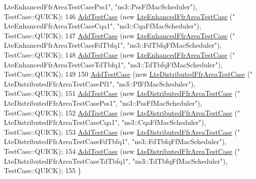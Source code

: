 \begin{DoxyCode}
{      LteEnhancedFfrAreaTestCasePss1"}, \textcolor{stringliteral}{"ns3::PssFfMacScheduler"}), TestCase::QUICK);
146   \hyperlink{classns3_1_1TestCase_a3718088e3eefd5d6454569d2e0ddd835}{AddTestCase} (\textcolor{keyword}{new} \hyperlink{classLteEnhancedFfrAreaTestCase}{LteEnhancedFfrAreaTestCase} (\textcolor{stringliteral}{"
      LteEnhancedFfrAreaTestCaseCqa1"}, \textcolor{stringliteral}{"ns3::CqaFfMacScheduler"}), TestCase::QUICK);
147   \hyperlink{classns3_1_1TestCase_a3718088e3eefd5d6454569d2e0ddd835}{AddTestCase} (\textcolor{keyword}{new} \hyperlink{classLteEnhancedFfrAreaTestCase}{LteEnhancedFfrAreaTestCase} (\textcolor{stringliteral}{"
      LteEnhancedFfrAreaTestCaseFdTbfq1"}, \textcolor{stringliteral}{"ns3::FdTbfqFfMacScheduler"}), TestCase::QUICK);
148   \hyperlink{classns3_1_1TestCase_a3718088e3eefd5d6454569d2e0ddd835}{AddTestCase} (\textcolor{keyword}{new} \hyperlink{classLteEnhancedFfrAreaTestCase}{LteEnhancedFfrAreaTestCase} (\textcolor{stringliteral}{"
      LteEnhancedFfrAreaTestCaseTdTbfq1"}, \textcolor{stringliteral}{"ns3::TdTbfqFfMacScheduler"}), TestCase::QUICK);
149 
150   \hyperlink{classns3_1_1TestCase_a3718088e3eefd5d6454569d2e0ddd835}{AddTestCase} (\textcolor{keyword}{new} \hyperlink{classLteDistributedFfrAreaTestCase}{LteDistributedFfrAreaTestCase} (\textcolor{stringliteral}{"
      LteDistributedFfrAreaTestCasePf1"}, \textcolor{stringliteral}{"ns3::PfFfMacScheduler"}), TestCase::QUICK);
151   \hyperlink{classns3_1_1TestCase_a3718088e3eefd5d6454569d2e0ddd835}{AddTestCase} (\textcolor{keyword}{new} \hyperlink{classLteDistributedFfrAreaTestCase}{LteDistributedFfrAreaTestCase} (\textcolor{stringliteral}{"
      LteDistributedFfrAreaTestCasePss1"}, \textcolor{stringliteral}{"ns3::PssFfMacScheduler"}), TestCase::QUICK);
152   \hyperlink{classns3_1_1TestCase_a3718088e3eefd5d6454569d2e0ddd835}{AddTestCase} (\textcolor{keyword}{new} \hyperlink{classLteDistributedFfrAreaTestCase}{LteDistributedFfrAreaTestCase} (\textcolor{stringliteral}{"
      LteDistributedFfrAreaTestCaseCqa1"}, \textcolor{stringliteral}{"ns3::CqaFfMacScheduler"}), TestCase::QUICK);
153   \hyperlink{classns3_1_1TestCase_a3718088e3eefd5d6454569d2e0ddd835}{AddTestCase} (\textcolor{keyword}{new} \hyperlink{classLteDistributedFfrAreaTestCase}{LteDistributedFfrAreaTestCase} (\textcolor{stringliteral}{"
      LteDistributedFfrAreaTestCaseFdTbfq1"}, \textcolor{stringliteral}{"ns3::FdTbfqFfMacScheduler"}), TestCase::QUICK);
154   \hyperlink{classns3_1_1TestCase_a3718088e3eefd5d6454569d2e0ddd835}{AddTestCase} (\textcolor{keyword}{new} \hyperlink{classLteDistributedFfrAreaTestCase}{LteDistributedFfrAreaTestCase} (\textcolor{stringliteral}{"
      LteDistributedFfrAreaTestCaseTdTbfq1"}, \textcolor{stringliteral}{"ns3::TdTbfqFfMacScheduler"}), TestCase::QUICK);
155 \}
\end{DoxyCode}


